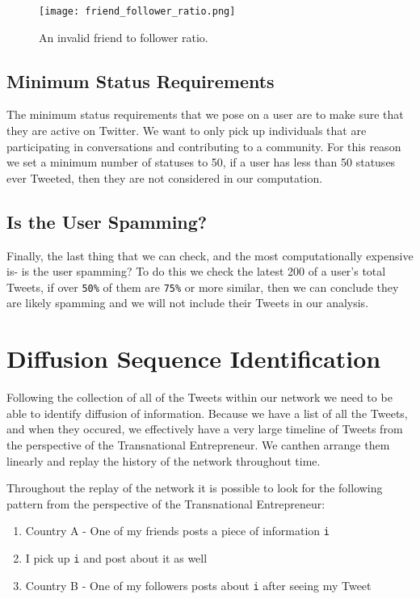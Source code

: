 \begin{figure}[H]
  \centering
  \texttt{[image: friend\_follower\_ratio.png]}
  \caption{An invalid friend to follower ratio.}
\end{figure}


\subsection{Minimum Status Requirements}
The minimum status requirements that we pose on a user are to make
sure that they are active on Twitter. We want to only pick up
individuals that are participating in conversations and contributing
to a community. For this reason we set a minimum number of statuses to
50, if a user has less than 50 statuses ever Tweeted, then they are
not considered in our computation.

\subsection{Is the User Spamming?}
Finally, the last thing that we can check, and the most
computationally expensive is- is the user spamming? To do this we
check the latest 200 of a user's total Tweets, if over \verb|50%| of
them are \verb|75%| or more similar, then we can conclude they are
likely spamming and we will not include their Tweets in our analysis.

\section{Diffusion Sequence Identification}
Following the collection of all of the Tweets within our network we
need to be able to identify diffusion of information. Because we have
a list of all the Tweets, and when they occured, we effectively have a
very large timeline of Tweets from the perspective of the
Transnational Entrepreneur. We canthen arrange them linearly and
replay the history of the network throughout time.

Throughout the replay of the network it is possible to look for the
following pattern from the perspective of the Transnational
Entrepreneur:

\begin{enumerate}
\item Country A - One of my friends posts a piece of information \verb|i| 
\item I pick up \verb|i| and post about it as well
\item Country B - One of my followers posts about \verb|i| after seeing my Tweet
\end{enumerate}

